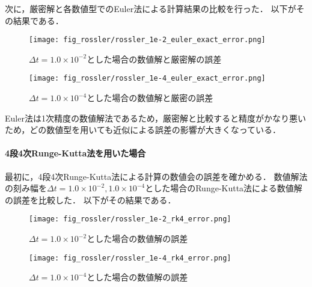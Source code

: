 次に，厳密解と各数値型でのEuler法による計算結果の比較を行った．
以下がその結果である．\\
\begin{figure}[H]
    \centering
    \begin{minipage}[b]{0.49\columnwidth}
        \centering
        \texttt{[image: fig\_rossler/rossler\_1e-2\_euler\_exact\_error.png]}
        \caption{$\Delta t = 1.0 \times 10^{-2}$とした場合の数値解と厳密解の誤差}
        \label{fig:rossler_1e-2_eluer_exact_error}
    \end{minipage}
    \begin{minipage}[b]{0.49\columnwidth}
        \centering
        \texttt{[image: fig\_rossler/rossler\_1e-4\_euler\_exact\_error.png]}
        \caption{$\Delta t = 1.0 \times 10^{-4}$とした場合の数値解と厳密の誤差}
        \label{fig:rossler_1e-4_euler_exact_error}
    \end{minipage}
\end{figure}
Euler法は1次精度の数値解法であるため，厳密解と比較すると精度がかなり悪いため，どの数値型を用いても近似による誤差の影響が大きくなっている．

\paragraph*{4段4次Runge-Kutta法を用いた場合}
最初に，4段4次Runge-Kutta法による計算の数値会の誤差を確かめる．
数値解法の刻み幅を$\Delta t = 1.0 \times 10^{-2},1.0 \times 10^{-4}$とした場合のRunge-Kutta法による数値解の誤差を比較した．
以下がその結果である．
\begin{figure}[H]
    \centering
    \begin{minipage}[b]{0.49\columnwidth}
        \centering
        \texttt{[image: fig\_rossler/rossler\_1e-2\_rk4\_error.png]}
        \caption{$\Delta t = 1.0 \times 10^{-2}$とした場合の数値解の誤差}
        \label{fig:rossler_1e-2_rk4_error}
    \end{minipage}
    \begin{minipage}[b]{0.49\columnwidth}
        \centering
        \texttt{[image: fig\_rossler/rossler\_1e-4\_rk4\_error.png]}
        \caption{$\Delta t = 1.0 \times 10^{-4}$とした場合の数値解の誤差}
        \label{fig:rossler_1e-4_rk4_error}
    \end{minipage}   
\end{figure}


